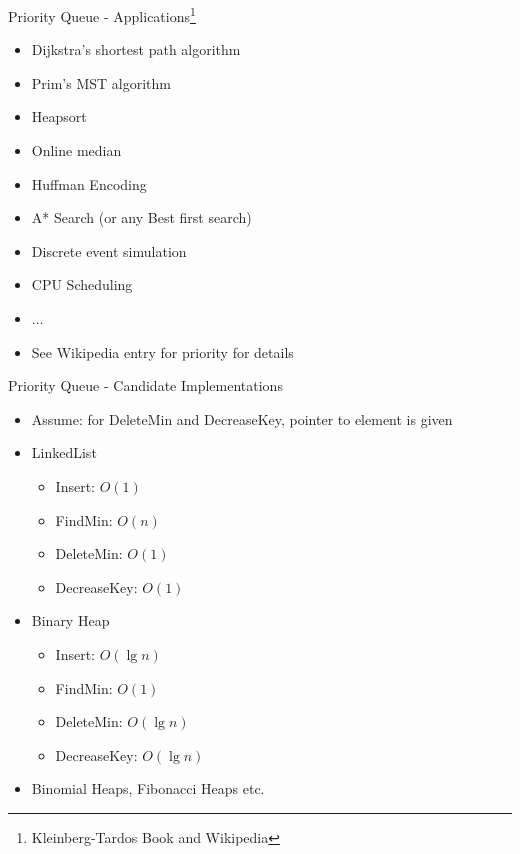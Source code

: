 \documentclass{beamer}
\begin{document}
\begin{frame}{Priority Queue - Applications\footnote{{Kleinberg-Tardos Book and Wikipedia}}}
    \begin{itemize}
        \item Dijkstra's shortest path algorithm
        \item Prim's MST algorithm
        \item Heapsort
        \item Online median
        \item Huffman Encoding
        \item A* Search (or any Best first search)
        \item Discrete event simulation
        \item CPU Scheduling
        \item $\ldots$
        \item See Wikipedia entry for priority for details
    \end{itemize}
\end{frame}

\begin{frame}{Priority Queue - Candidate Implementations}
    \begin{itemize}
        \item Assume: for DeleteMin and DecreaseKey, pointer to element is given
        \item LinkedList
        \begin{itemize}
            \item Insert: \pause $O(1)$
            \item FindMin: \pause $O(n)$
            \item DeleteMin: \pause $O(1)$
            \item DecreaseKey: \pause $O(1)$
        \end{itemize}
        \item Binary Heap 
        \begin{itemize}
            \item Insert: $O(\lg n)$
            \item FindMin: $O(1)$
            \item DeleteMin: $O(\lg n)$
            \item DecreaseKey: $O(\lg n)$
        \end{itemize}
        \item Binomial Heaps, Fibonacci Heaps etc.
    \end{itemize}
\end{frame}
\end{document}
